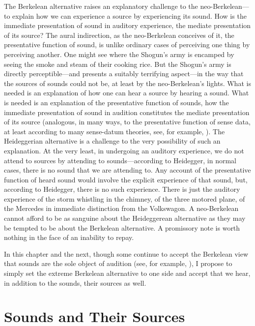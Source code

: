 The Berkelean alternative raises an explanatory challenge to the neo-Berkelean---\-to explain how we can experience a source by experiencing its sound. How is the immediate presentation of sound in auditory experience, the mediate presentation of its source? The aural indirection, as the neo-Berkelean conceives of it, the presentative function of sound, is unlike ordinary cases of perceiving one thing by perceiving another. One might see where the Shogun's army is encamped by seeing the smoke and steam of their cooking rice. But the Shogun's army is directly perceptible---and presents a suitably terrifying aspect---in the way that the sources of sounds could not be, at least by the neo-Berkelean's lights. What is needed is an explanation of how one can hear a source by hearing a sound. What is needed is an explanation of the presentative function of sounds, how the immediate presentation of sound in audition constitutes the mediate presentation of its source (analogous, in many ways, to the presentative function of sense data, at least according to many sense-datum theories, see, for example, \citealt{Price:1932fk}). The Heideggerian alternative is a challenge to the very possibility of such an explanation. At the very least, in undergoing an auditory experience, we do not attend to sources by attending to sounds---according to Heidegger, in normal cases, there is no sound that we are attending to. Any account of the presentative function of heard sound would involve the explicit experience of that sound, but, according to Heidegger, there is no such experience. There is just the auditory experience of the storm whistling in the chimney, of the three motored plane, of the Mercedes in immediate distinction from the Volkswagon. A neo-Berkelean cannot afford to be as sanguine about the Heideggerean alternative as they may be tempted to be about the Berkelean alternative. A promissory note is worth nothing in the face of an inability to repay.

In this chapter and the next, though some continue to accept the Berkelean view that sounds are the sole object of audition (see, for example, \citealt{Smith:2002sa}), I propose to simply set the extreme Berkelean alternative to one side and accept that we hear, in addition to the sounds, their sources as well. 


\section{Sounds and Their Sources} %
\label{sec:sounds_and_their_sources}

